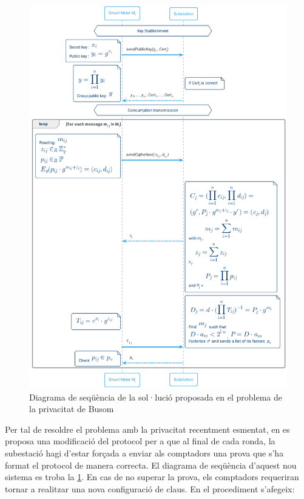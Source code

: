 \begin{figure}[H]
	\centering
	\includegraphics[width=13cm]{umls/garra.png}
	\caption{Diagrama de seqüència de la sol·lució proposada en el problema de la privacitat de Busom}
	\label{fig:garra}
\end{figure}
Per tal de resoldre el problema amb la privacitat recentment esmentat, en \cite{repair-busom} es proposa una modificació del protocol per a que al final de cada ronda, la subestació hagi d'estar forçada a enviar als comptadors una prova que s'ha format el protocol de manera correcta. El diagrama de seqüència d'aquest nou sistema es troba la \cref{fig:garra}. En cas de no superar la prova, els comptadors requeriran tornar a realitzar una nova configuració de claus. En el procediment s'afegeix:

